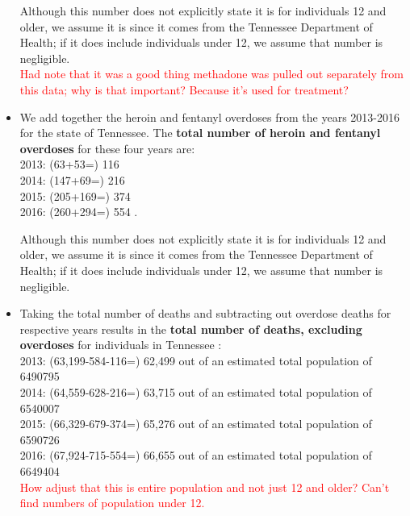 \documentclass[12pt]{article}
\begin{document}
\begin{itemize}
Although this number does not explicitly state it is for individuals 12 and older, we assume it is since it comes from the Tennessee Department of Health; if it does include individuals under 12, we assume that number is negligible. \\

\textcolor{red}{Had note that it was a good thing methadone was pulled out separately from this data; why is that important? Because it's used for treatment?} \\

\item We add together the heroin and fentanyl overdoses from the years 2013-2016 for the state of Tennessee. The \textbf{total number of heroin and fentanyl overdoses} for these four years are: \\
2013: (63+53=) 116 \\
2014: (147+69=) 216 \\
2015: (205+169=) 374 \\
2016: (260+294=) 554 \cite{PDO}. 

Although this number does not explicitly state it is for individuals 12 and older, we assume it is since it comes from the Tennessee Department of Health; if it does include individuals under 12, we assume that number is negligible. \\



\item Taking the total number of deaths and subtracting out overdose deaths for respective years results in the \textbf{total number of deaths, excluding overdoses} for individuals in Tennessee \cite{TNgov2}: \\
2013: (63,199-584-116=) 62,499 out of an estimated total population of 6490795 \\
2014: (64,559-628-216=) 63,715 out of an estimated total population of 6540007 \\
2015: (66,329-679-374=) 65,276 out of an estimated total population of 6590726 \\
2016: (67,924-715-554=) 66,655 out of an estimated total population of 6649404 \\


\textcolor{red}{How adjust that this is entire population and not just 12 and older? Can't find numbers of population under 12.}


\end{itemize}
\end{document}
